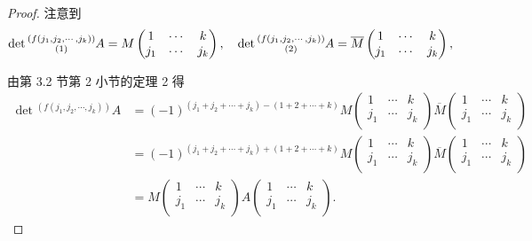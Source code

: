 \documentclass[color=black,device=normal,lang=cn,mode=geye]{elegantnote}
\begin{document}
\begin{landscape}
\begin{proof}
    注意到
    \[\det\begin{subarray}{c}
    (f(j_1,j_2,\cdots,j_k)) \\
    (1)
    \end{subarray}A=M\begin{pmatrix}
        1 & \cdots & k \\
        j_1 & \cdots & j_k \\
    \end{pmatrix},\quad\det\begin{subarray}{c}
    (f(j_1,j_2,\cdots,j_k)) \\
    (2)
    \end{subarray}A=\overline{M}\begin{pmatrix}
        1 & \cdots & k \\
        j_1 & \cdots & j_k \\
    \end{pmatrix},\]

    由第 3.2 节第 2 小节的定理 2 得
    \begin{align*}
        \det{}^{(f(j_1,j_2,\cdots,j_k))}A & =(-1)^{(j_1+j_2+\cdots+j_k)-(1+2+\cdots+k)}M\begin{pmatrix}
            1 & \cdots & k \\
            j_1 & \cdots & j_k \\
        \end{pmatrix}\overline{M}\begin{pmatrix}
            1 & \cdots & k \\
            j_1 & \cdots & j_k \\
        \end{pmatrix} \\
        & =(-1)^{(j_1+j_2+\cdots+j_k)+(1+2+\cdots+k)}M\begin{pmatrix}
            1 & \cdots & k \\
            j_1 & \cdots & j_k \\
        \end{pmatrix}\overline{M}\begin{pmatrix}
            1 & \cdots & k \\
            j_1 & \cdots & j_k \\
        \end{pmatrix} \\
        & =M\begin{pmatrix}
            1 & \cdots & k \\
            j_1 & \cdots & j_k \\
        \end{pmatrix}A\begin{pmatrix}
            1 & \cdots & k \\
            j_1 & \cdots & j_k \\
        \end{pmatrix}.
    \end{align*}


\end{proof}
\end{landscape}
\end{document}
